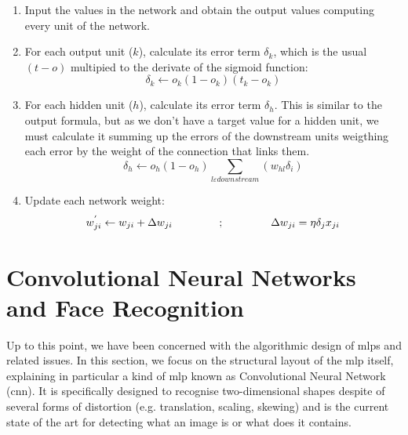 		\begin{enumerate}
			\item Input the values in the network and obtain the output values computing every unit of the network.
			\item For each output unit ($k$), calculate its error term $\delta_k$, which is the usual $(t-o)$ multipied to the derivate of the sigmoid function:
				\begin{equation}
					\label{backpropagation_output_error}
					\delta_k \leftarrow o_k (1 - o_k)(t_k - o_k)
				\end{equation}				

			\item For each hidden unit ($h$), calculate its error term $\delta_h$. This is similar to the output formula, but as we don't have a target value for a hidden unit, we must calculate it summing up the errors of the downstream units weigthing each error by the weight of the connection that links them. 
				\begin{equation}
					\label{backpropagation_hidden_error}
					\delta_h \leftarrow o_h (1 - o_h) \sum_{l \varepsilon downstream} (w_{hl} \delta_i)
				\end{equation}

			\item Update each network weight:
				\begin{equation}
					\label{backpropagation_weight_update}
					w^{'}_{ji} \leftarrow w_{ji} + \Delta w_{ji} \hspace{1.5cm} ; \hspace{1.5cm} \Delta w_{ji} = \eta \delta_j x_{ji}
				\end{equation}
		\end{enumerate} 




\section{Convolutional Neural Networks and Face Recognition}
Up to this point, we have been concerned with the algorithmic design of \glspl{mlp} and related issues. In this section, we focus on the structural layout of the \gls{mlp} itself, explaining in particular a kind of \gls{mlp} known as Convolutional Neural Network (\gls{cnn}). It is specifically designed to recognise two-dimensional shapes despite of several forms of distortion (e.g. translation, scaling, skewing) and is the current state of the art for detecting what an image is or what does it contains.

